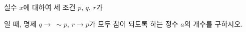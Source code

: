 실수 $x$에 대하여 세 조건 $p$, $q$, $r$가 \par\smallskip{}\par\smallskip\noindent 일 때, 명제 $q\longrightarrow\ \sim p$, $r\longrightarrow p$가 모두 참이 되도록 하는 정수 $a$의 개수를 구하시오.
